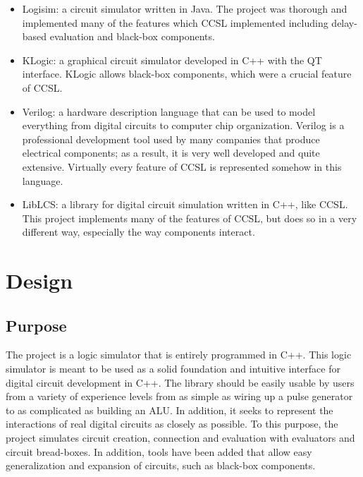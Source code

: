 \documentclass{article}
\begin{document}
\begin{itemize}

\item Logisim: a circuit simulator written in Java. The project was thorough and implemented many of the features which CCSL implemented including delay-based evaluation and black-box components.\cite{Logisim}

\item KLogic: a graphical circuit simulator developed in C++ with the QT interface. KLogic allows black-box components, which were a crucial feature of CCSL.\cite{KLogic}

\item Verilog: a hardware description language that can be used to model everything from digital circuits to computer chip organization. Verilog is a professional development tool used by many companies that produce electrical components; as a result, it is very well developed and quite extensive. Virtually every feature of CCSL is represented somehow in this language.\cite{Verilog}

\item LibLCS: a library for digital circuit simulation written in C++, like CCSL. This project implements many of the features of CCSL, but does so in a very different way, especially the way components interact.\cite{libLCS}

\end{itemize}

\section{Design}

\subsection{Purpose}

The project is a logic simulator that is entirely programmed in C++. This logic simulator is meant to be used as a solid foundation and intuitive interface for digital circuit development in C++. The library should be easily usable by users from a variety of experience levels from as simple as wiring up a pulse generator to as complicated as building an ALU. In addition, it seeks to represent the interactions of real digital circuits as closely as possible. To this purpose, the project simulates circuit creation, connection and evaluation with evaluators and circuit bread-boxes. In addition, tools have been added that allow easy generalization and expansion of circuits, such as black-box components.
\end{document}
